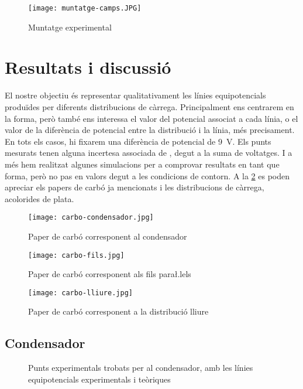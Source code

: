 \begin{figure}[htb]
	\centering
	\texttt{[image: muntatge-camps.JPG]}
	\caption{Muntatge experimental}
	\label{fig:muntatge}
\end{figure}

\section{Resultats i discussió}
El nostre objectiu és representar qualitativament les línies equipotencials produïdes per diferents distribucions de càrrega. Principalment ens centrarem en la forma, però també ens interessa el valor del potencial associat a cada línia, o el valor de la diferència de potencial entre la distribució i la línia, més precisament. En tots els casos, hi fixarem una diferència de potencial de \SI{9}{V}. Els punts mesurats tenen alguna incertesa associada de , degut a la suma de voltatges. I a més hem realitzat algunes simulacions per a comprovar resultats en tant que forma, però no pas en valors degut a les condicions de contorn. A la \cref{fig:carbo condensador} es poden apreciar els papers de carbó ja mencionats i les distribucions de càrrega, acolorides de plata.

\begin{figure}[htb]
  \centering
	\texttt{[image: carbo-condensador.jpg]}
  \caption{Paper de carbó corresponent al condensador}
  \label{fig:carbo condensador}
\end{figure}

\begin{figure}[htb]
  \centering
	\texttt{[image: carbo-fils.jpg]}
  \caption{Paper de carbó corresponent als fils para\l.lels}
  \label{fig:carbo fils}
\end{figure}

\begin{figure}[htb]
  \centering
	\texttt{[image: carbo-lliure.jpg]}
  \caption{Paper de carbó corresponent a la distribució lliure}
  \label{fig:carbo lliure}
\end{figure}

\subsection{Condensador}
\begin{figure}[htb]
  \centering \small \sffamily
  
  \caption{Punts experimentals trobats per al condensador, amb les línies equipotencials experimentals i teòriques}
  \label{fig:camp condensador}
\end{figure}

